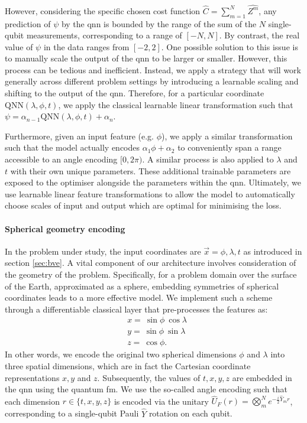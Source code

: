 \documentclass[aps,pra,a4paper,twocolumn,longbibliography,groupedaddress]{revtex4-2}
\begin{document}
However, considering the specific chosen cost function $\hat{C} = \sum^N_{m=1} \hat{Z^m}$, any prediction of $\psi$ by the \gls{qnn} is bounded by the range of the sum of the $N$ single-qubit measurements, corresponding to a range of $[-N, N]$. By contrast, the real value of $\psi$ in the data ranges from $[-2, 2]$. 
One possible solution to this issue is to manually scale the output of the \gls{qnn} to be larger or smaller. However, this process can be tedious and inefficient. Instead, we apply a strategy that will work generally across different problem settings by introducing a learnable scaling and shifting to the output of the \gls{qnn}. Therefore, for a particular coordinate $\text{QNN}(\lambda, \phi, t)$, we apply the classical learnable linear transformation such that $\psi = \alpha_{n-1}\text{QNN}(\lambda, \phi, t) + \alpha_n$. 

Furthermore, given an input feature (e.g. $\phi$), we apply a similar transformation such that the model actually encodes $\alpha_1\phi + \alpha_2$ to conveniently span a range accessible to an angle encoding $[0, 2\pi)$. A similar process is also applied to $\lambda$ and $t$ with their own unique parameters. These additional trainable parameters are exposed to the optimiser alongside the parameters within the \gls{qnn}. 
Ultimately, we use learnable linear feature transformations to allow the model to automatically choose scales of input and output which are optimal for minimising the loss.
\\

\paragraph{Spherical geometry encoding}

In the problem under study, the input coordinates are $\vec{x} = \phi, \lambda, t$ as introduced in section \ref{sec:bve}. 
A vital component of our architecture involves consideration of the geometry of the problem. Specifically, for a problem domain over the surface of the Earth, approximated as a sphere, embedding symmetries of spherical coordinates leads to a more effective model. We implement such a scheme through a differentiable classical layer that pre-processes the features as:
%
\begin{align}
    &x = \: \sin\phi \: \cos\lambda\\
    &y = \: \sin\phi \: \sin\lambda\\
    &z = \: \cos\phi.
\end{align}
%
In other words, we encode the original two spherical dimensions $\phi$ and $\lambda$ into three spatial dimensions, which are in fact the Cartesian coordinate representations $x, y$ and $z$. Subsequently, the values of $t, x, y, z$ are embedded in the \gls{qnn} using the quantum \gls{fm}. We use the so-called angle encoding such that each dimension $ r \in \{t, x,y,z\}$ is encoded via the unitary $\hat{U}_F(r) = \bigotimes_{m}^N e^{-\frac{i}{2}\hat{Y}_m r}$, corresponding to a single-qubit Pauli $\hat{Y}$ rotation on each qubit.
\\
\end{document}
